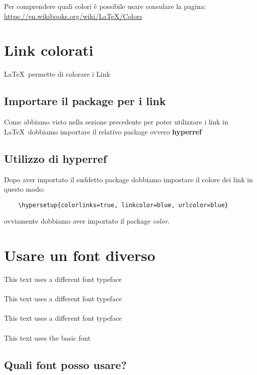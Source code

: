 \documentclass[a4paper, 11p]{article}
\begin{document}
Per comprendere quali colori è possibile usare consulare la pagina:
\url{https://en.wikibooks.org/wiki/LaTeX/Colors}



\vspace{2cm}

\section{Link colorati}

\LaTeX\ permette di colorare i Link

\subsection{Importare il package per i link}

Come abbiamo visto nella sezione precedente per poter utilizzare i link in \LaTeX\ dobbiamo importare il relativo package ovvero \textbf{hyperref}

\subsection{Utilizzo di hyperref}

Dopo aver importato il suddetto package dobbiamo impostare il colore dei link in questo modo:

\begin{verbatim}
    \hypersetup{colorlinks=true, linkcolor=blue, urlcolor=blue}
\end{verbatim}

ovviamente dobbiamo aver importato il package \textit{color}.


\vspace{1cm}


\section{Usare un font diverso}

{\selectfont
This text uses a different font typeface
}
\\\\
{\selectfont
This text uses a different font typeface
}
\\\\
{\selectfont
This text uses a different font typeface
}
\\\\
This text uses the basic font


\subsection{Quali font posso usare?}
\end{document}
